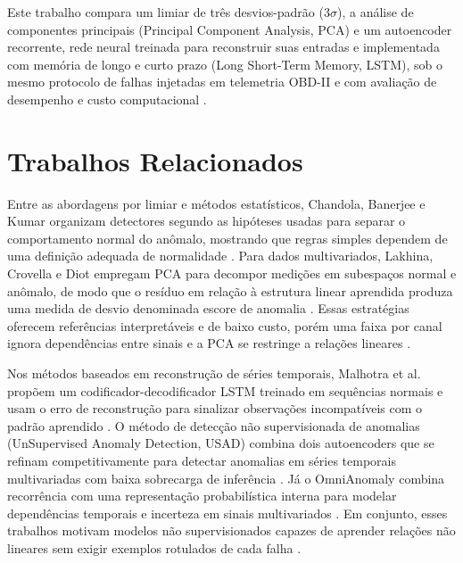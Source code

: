 \documentclass[conference]{IEEEtran}
\begin{document}
Este trabalho compara um limiar de três desvios-padrão ($3\sigma$), a análise de componentes principais (Principal Component Analysis, PCA) e um autoencoder recorrente, rede neural treinada para reconstruir suas entradas e implementada com memória de longo e curto prazo (Long Short-Term Memory, LSTM), sob o mesmo protocolo de falhas injetadas em telemetria OBD-II e com avaliação de desempenho e custo computacional \cite{lakhina2004diagnosing,malhotra2016lstm,weber2023automotive}.

\section{Trabalhos Relacionados}

Entre as abordagens por limiar e métodos estatísticos, Chandola, Banerjee e Kumar organizam detectores segundo as hipóteses usadas para separar o comportamento normal do anômalo, mostrando que regras simples dependem de uma definição adequada de normalidade \cite{chandola2009anomaly}.
Para dados multivariados, Lakhina, Crovella e Diot empregam PCA para decompor medições em subespaços normal e anômalo, de modo que o resíduo em relação à estrutura linear aprendida produza uma medida de desvio denominada escore de anomalia \cite{lakhina2004diagnosing}.
Essas estratégias oferecem referências interpretáveis e de baixo custo, porém uma faixa por canal ignora dependências entre sinais e a PCA se restringe a relações lineares \cite{chandola2009anomaly,lakhina2004diagnosing}.

Nos métodos baseados em reconstrução de séries temporais, Malhotra et al. propõem um codificador-decodificador LSTM treinado em sequências normais e usam o erro de reconstrução para sinalizar observações incompatíveis com o padrão aprendido \cite{malhotra2016lstm}.
O método de detecção não supervisionada de anomalias (UnSupervised Anomaly Detection, USAD) combina dois autoencoders que se refinam competitivamente para detectar anomalias em séries temporais multivariadas com baixa sobrecarga de inferência \cite{audibert2020usad}.
Já o OmniAnomaly combina recorrência com uma representação probabilística interna para modelar dependências temporais e incerteza em sinais multivariados \cite{su2019robust}.
Em conjunto, esses trabalhos motivam modelos não supervisionados capazes de aprender relações não lineares sem exigir exemplos rotulados de cada falha \cite{malhotra2016lstm,audibert2020usad,su2019robust}.
\end{document}
